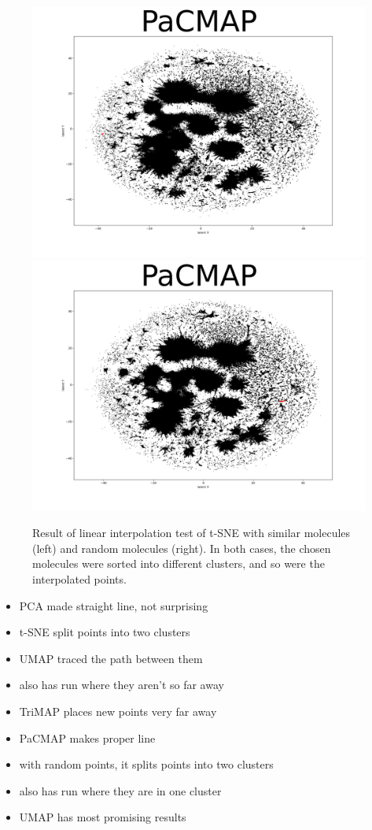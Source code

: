 \begin{figure}
	\centering
	\includegraphics[width=0.5\columnwidth]{figures/PaCMAP_LERP_coxib}
	\includegraphics[width=0.5\columnwidth]{figures/PaCMAP_LERP_random}
	\caption{Result of linear interpolation test of t-SNE with similar molecules (left) and random molecules (right). In both cases, the chosen molecules were sorted into different clusters, and so were the interpolated points.}
	\label{fig:pacmap:lerp}
\end{figure}


\begin{itemize}
	\item PCA made straight line, not surprising
	\item t-SNE split points into two clusters
	\item UMAP traced the path between them
	\item also has run where they aren't so far away
	\item TriMAP places new points very far away
	\item PaCMAP makes proper line
	\item with random points, it splits points into two clusters
	\item also has run where they are in one cluster
	\item UMAP has most promising results
\end{itemize}

